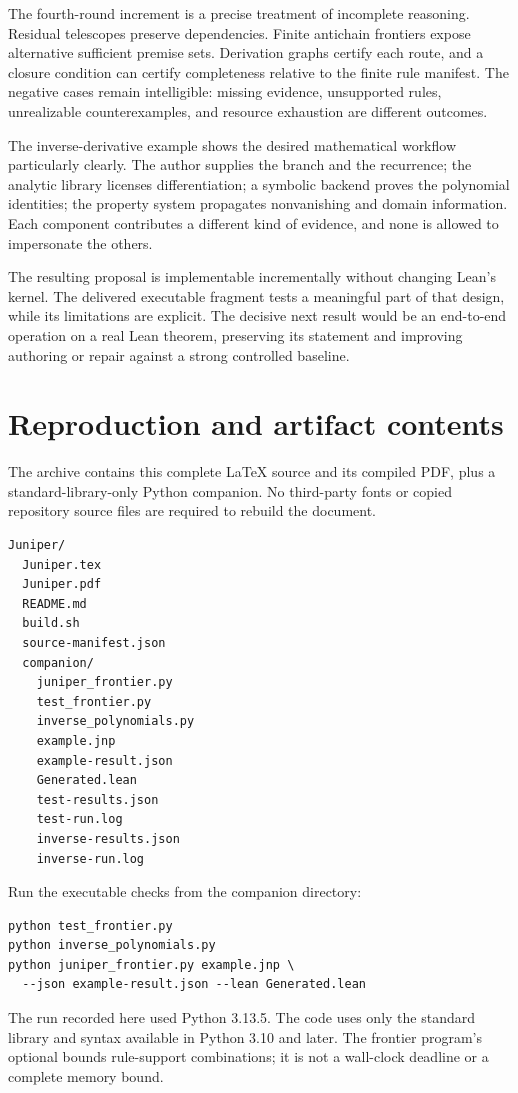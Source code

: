 \documentclass[11pt,a4paper]{article}
\newcommand{\code}[1]{\texttt{\small\detokenize{#1}}}
\theoremstyle{definition}\newtheorem{definition}[theorem]{Definition}
\theoremstyle{remark}\newtheorem{remark}[theorem]{Remark}
\begin{document}
The fourth-round increment is a precise treatment of incomplete reasoning. Residual telescopes preserve dependencies. Finite antichain frontiers expose alternative sufficient premise sets. Derivation graphs certify each route, and a closure condition can certify completeness relative to the finite rule manifest. The negative cases remain intelligible: missing evidence, unsupported rules, unrealizable counterexamples, and resource exhaustion are different outcomes.

The inverse-derivative example shows the desired mathematical workflow particularly clearly. The author supplies the branch and the recurrence; the analytic library licenses differentiation; a symbolic backend proves the polynomial identities; the property system propagates nonvanishing and domain information. Each component contributes a different kind of evidence, and none is allowed to impersonate the others.

The resulting proposal is implementable incrementally without changing Lean's kernel. The delivered executable fragment tests a meaningful part of that design, while its limitations are explicit. The decisive next result would be an end-to-end operation on a real Lean theorem, preserving its statement and improving authoring or repair against a strong controlled baseline.

\appendix
\section{Reproduction and artifact contents}
The archive contains this complete LaTeX source and its compiled PDF, plus a standard-library-only Python companion. No third-party fonts or copied repository source files are required to rebuild the document.
\begin{lstlisting}
Juniper/
  Juniper.tex
  Juniper.pdf
  README.md
  build.sh
  source-manifest.json
  companion/
    juniper_frontier.py
    test_frontier.py
    inverse_polynomials.py
    example.jnp
    example-result.json
    Generated.lean
    test-results.json
    test-run.log
    inverse-results.json
    inverse-run.log
\end{lstlisting}
Run the executable checks from the companion directory:
\begin{lstlisting}
python test_frontier.py
python inverse_polynomials.py
python juniper_frontier.py example.jnp \
  --json example-result.json --lean Generated.lean
\end{lstlisting}
The run recorded here used Python 3.13.5. The code uses only the standard library and syntax available in Python 3.10 and later. The frontier program's optional \code{--max-attempts} bounds rule-support combinations; it is not a wall-clock deadline or a complete memory bound.
\end{document}
